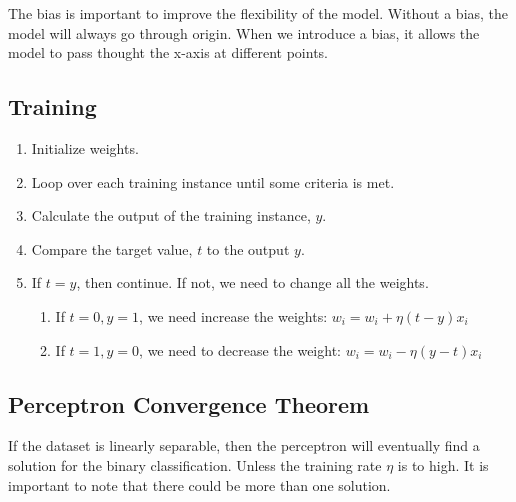 \documentclass{article}
\begin{document}
    The bias is important to improve the flexibility of the model. 
    Without a bias, the model will always go through origin. 
    When we introduce a bias, it allows the model to pass thought the x-axis at different points. 
    

    \subsection{Training}

    \begin{enumerate}
        \item Initialize weights.
        \item Loop over each training instance until some criteria is met.
        \item Calculate the output of the training instance, $y$.
        \item Compare the target value, $t$ to the output $y$.
        \item If $t = y$, then continue. If not, we need to change all the weights. 
        \begin{enumerate}
            \item If $t=0, y = 1$, we need increase the weights: $w_i = w_i + \eta(t-y)x_i$
            \item If $t=1, y = 0$, we need to decrease the weight: $w_i = w_i - \eta(y-t)x_i$
        \end{enumerate}
    \end{enumerate}


    \subsection{Perceptron Convergence Theorem}

    If the dataset is linearly separable, then the perceptron will eventually find a solution for the binary classification.
    Unless the training rate $\eta$ is to high. It is important to note that there could be more than one solution. 
\end{document}
